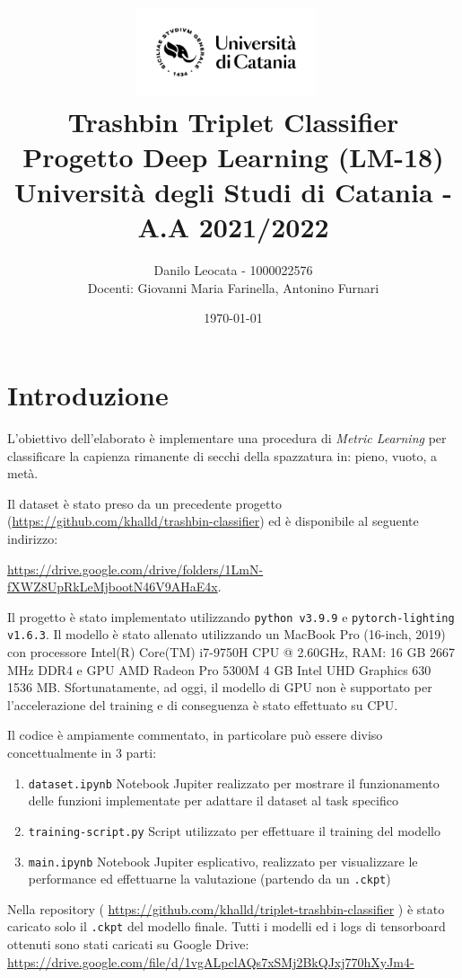 \documentclass[11pt]{article}
\title{ %
\includegraphics[width=0.4\textwidth]{UniCT-Logo-Nero}~\\
Trashbin Triplet Classifier \\ 
\large Progetto Deep Learning (LM-18) \\ Università degli Studi di Catania - A.A 2021/2022 \\
}
\author{ Danilo Leocata - 1000022576 \\ Docenti: Giovanni Maria Farinella, Antonino Furnari}
\date{\today}
\begin{document}
\maketitle	
\pagebreak


\section{Introduzione}

L'obiettivo dell'elaborato è implementare una procedura di \textit{Metric Learning} per classificare la 
capienza rimanente di secchi della spazzatura in: pieno, vuoto, a metà.

Il dataset è stato preso da un precedente progetto (\href{https://github.com/khalld/trashbin-classifier}{https://github.com/khalld/trashbin-classifier})
ed è disponibile al seguente indirizzo: \ \ \ \ 

\href{https://drive.google.com/drive/folders/1LmN-fXWZ8UpRkLeMjbootN46V9AHaE4x}{https://drive.google.com/drive/folders/1LmN-fXWZ8UpRkLeMjbootN46V9AHaE4x}.

Il progetto è stato implementato utilizzando \texttt{python v3.9.9} e \texttt{pytorch-lighting v1.6.3}. Il modello è stato allenato utilizzando un MacBook Pro (16-inch, 2019) con processore Intel(R) Core(TM) i7-9750H CPU @ 2.60GHz, RAM: 16 GB 2667 MHz DDR4 e GPU AMD Radeon Pro 5300M 4 GB
Intel UHD Graphics 630 1536 MB. Sfortunatamente, ad oggi, il modello di GPU non è supportato per l'accelerazione del training e di conseguenza è stato effettuato su CPU.

Il codice è ampiamente commentato, in particolare può essere diviso concettualmente in 3 parti:

\begin{enumerate}
    \item \texttt{dataset.ipynb} Notebook Jupiter realizzato per mostrare il funzionamento delle funzioni implementate per adattare il dataset al task specifico
    \item \texttt{training-script.py} Script utilizzato per effettuare il training del modello
    \item \texttt{main.ipynb} Notebook Jupiter esplicativo, realizzato per visualizzare le performance ed effettuarne la valutazione (partendo da un \texttt{.ckpt})
\end{enumerate}

Nella repository (
\href{https://github.com/khalld/triplet-trashbin-classifier}{https://github.com/khalld/triplet-trashbin-classifier} )
è stato caricato solo il \texttt{.ckpt} del modello finale. Tutti i modelli ed i logs di tensorboard ottenuti sono
stati caricati su Google Drive: \href{https://drive.google.com/file/d/1vgALpclAQs7xSMj2BkQJxj770hXyJm4-}{https://drive.google.com/file/d/1vgALpclAQs7xSMj2BkQJxj770hXyJm4-}
\end{document}
